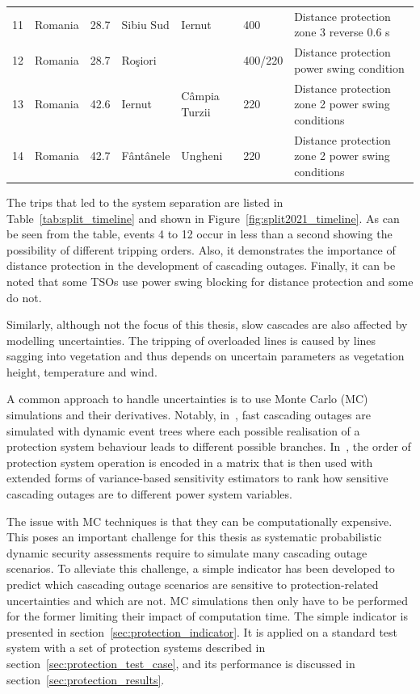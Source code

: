 \begin{landscape}
\begin{table}
\begin{adjustbox}{max width=\linewidth}
\begin{tabular}{@{}lllllll@{}}
11 & Romania & 28.7      & Sibiu Sud    & Iernut         & 400          & Distance protection zone 3 reverse 0.6 s               \\
12 & Romania & 28.7      & Roşiori      &                & 400/220      & Distance protection power swing condition              \\
13 & Romania & 42.6 & Iernut & Câmpia Turzii & 220 & Distance protection zone 2 power swing conditions \\
14 & Romania & 42.7      & Fântânele    & Ungheni        & 220          & Distance protection zone 2 power swing conditions      \\ \bottomrule
\end{tabular}
\end{adjustbox}
\end{table}
\end{landscape}

The trips that led to the system separation are listed in Table~\ref{tab:split_timeline} and shown in Figure~\ref{fig:split2021_timeline}. As can be seen from the table, events 4 to 12 occur in less than a second showing the possibility of different tripping orders. Also, it demonstrates the importance of distance protection in the development of cascading outages. Finally, it can be noted that some TSOs use power swing blocking for distance protection and some do not.

Similarly, although not the focus of this thesis, slow cascades are also affected by modelling uncertainties. The tripping of overloaded lines is caused by lines sagging into vegetation and thus depends on uncertain parameters as vegetation height, temperature and wind. %

A common approach to handle uncertainties is to use Monte Carlo (MC) simulations and their derivatives. Notably, in~\cite{TwoLevelPSA}, fast cascading outages are simulated with dynamic event trees where each possible realisation of a protection system behaviour leads to different possible branches. In~\cite{SequencesRelaySobol}, the order of protection system operation is encoded in a matrix that is then used with extended forms of variance-based sensitivity estimators to rank how sensitive cascading outages are to different power system variables.

The issue with MC techniques is that they can be computationally expensive. This poses an important challenge for this thesis as systematic probabilistic dynamic security assessments require to simulate many cascading outage scenarios. To alleviate this challenge, a simple indicator has been developed to predict which cascading outage scenarios are sensitive to protection-related uncertainties and which are not. MC simulations then only have to be performed for the former limiting their impact of computation time. The simple indicator is presented in section~\ref{sec:protection_indicator}. It is applied on a standard test system with a set of protection systems described in section~\ref{sec:protection_test_case}, and its performance is discussed in section~\ref{sec:protection_results}.


